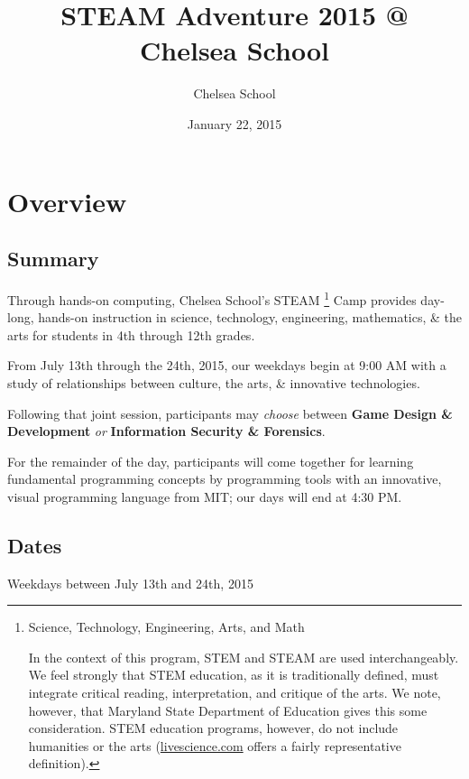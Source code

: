 \documentclass[letterpaper,10pt,english]{sphinxmanual}
\title{STEAM Adventure 2015 @ Chelsea School}
\date{January 22, 2015}
\author{Chelsea School}
\begin{document}
\maketitle
\tableofcontents
{}\label{indepth::doc}



\chapter{Overview}
\label{description:summer-steam-program-2015}\label{description::doc}\label{description:overview}

\section{Summary}
\label{description:summary}
Through hands-on computing, Chelsea School's STEAM \footnote{
Science, Technology, Engineering, Arts, and Math

In the context of this program, STEM and STEAM are used interchangeably. We feel strongly that STEM education, as it is traditionally defined, must integrate critical reading, interpretation, and critique of the arts. We note, however, that Maryland State Department of Education gives this some consideration. STEM education programs, however, do not include humanities or the arts (\href{http://www.livescience.com/43296-what-is-stem-education.html}{livescience.com} offers a fairly representative definition).
} Camp provides day-long, hands-on instruction in science, technology, engineering, mathematics, \& the arts for students in 4th through 12th grades.

From July 13th through the 24th, 2015, our weekdays begin at 9:00 AM with a study of relationships between culture, the arts, \& innovative technologies.

Following that joint session, participants may \emph{choose} between \textbf{Game Design \& Development} \emph{or} \textbf{Information Security \& Forensics}.

For the remainder of the day, participants will come together for learning fundamental programming concepts by programming tools with an innovative, visual programming language from MIT; our days will end at 4:30 PM.


\section{Dates}
\label{description:dates}
Weekdays between July 13th and 24th, 2015
\end{document}
